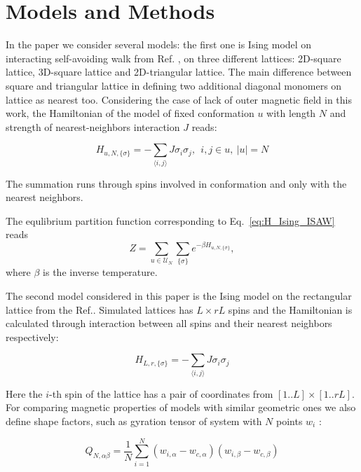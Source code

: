 \documentclass[a4paper]{jpconf}
\begin{document}
\section{Models and Methods}
In the paper we consider several models: the first one is Ising model on interacting self-avoiding walk from Ref. \cite{faizullina2021critical}, on three different lattices: 2D-square lattice, 3D-square lattice and 2D-triangular lattice. The main difference between square and triangular lattice in defining two additional diagonal monomers on lattice as nearest too. Considering the case of lack of outer magnetic field in this work, the Hamiltonian of the model of fixed conformation $u$ with length $N$ and strength of nearest-neighbors interaction $J$ reads:

\begin{equation}\label{eq:H_Ising_ISAW}
  H_{u, N, \{\sigma\}} = - \sum_{\langle i,j \rangle} J  \sigma_{i}  \sigma_{j},\ \ i,j \in u,\ |u| = N
\end{equation}

The summation runs through spins involved in conformation and only with the nearest neighbors. 

The equlibrium partition function corresponding to Eq.\ \eqref{eq:H_Ising_ISAW} reads
%
\begin{equation}
Z =\sum_{u \in \mathcal{U}_N} \sum_{\{\sigma\}} e ^{-\beta H_{u, N, \{\sigma\}} },
\label{eq:Z}
\end{equation}
%
where $\beta$ is the inverse temperature.

The second model considered in this paper is the Ising model on the rectangular lattice from the Ref.\cite{Selke2006}. Simulated lattices has $L \times rL$ spins and the Hamiltonian is calculated through interaction between all spins and their nearest neighbors respectively:

\begin{equation}\label{H_Ising_Rectan}
  H_{L, r, \{\sigma\}} = - \sum_{\langle i,j \rangle} J  \sigma_{i}  \sigma_{j}
\end{equation}

Here the $i$-th spin of the lattice has a pair of coordinates from $[1..L] \times [1..rL]$. For comparing magnetic properties of models with similar geometric ones we also define shape factors, such as gyration tensor of system with $N$ points $w_{i}$ \cite{Caracciolo2011}:

\begin{equation}\label{eq:Ten_G1}
    Q_{N,\alpha\beta} = \frac{1}{N} \sum^{N}_{i=1}(w_{i,\alpha} - w_{c, \alpha})(w_{i,\beta} - w_{c, \beta})
\end{equation}
\end{document}
